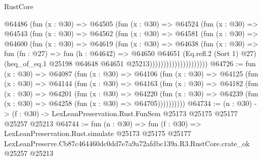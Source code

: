 \begin{lexlean}{RustCore}
\begin{coremodule}
                        @64486
                          (fun (x : @30) =>
                          @64505
                            (fun (x : @30) =>
                            @64524
                              (fun (x : @30) =>
                              @64543
                                (fun (x : @30) =>
                                @64562
                                  (fun (x : @30) =>
                                  @64581
                                    (fun (x : @30) =>
                                    @64600
                                      (fun (x : @30) =>
                                      @64619
                                        (fun (x : @30) =>
                                        @64638
                                          (fun (x : @30) =>
                                          fun (fn : @27) =>
                                          fun (h : @64642) =>
                                          @64650
                                            @64651
                                            (Eq.refl.{2} (Sort 1) @27)
                                            (heq_of_eq.{1}
                                              @25198
                                              @64648
                                              @64651
                                              @25213)))))))))))))))))))))
@64726 := fun (x : @30) =>
  @64087
    (fun (x : @30) =>
    @64106
      (fun (x : @30) =>
      @64125
        (fun (x : @30) =>
        @64144
          (fun (x : @30) =>
          @64163
            (fun (x : @30) =>
            @64182
              (fun (x : @30) =>
              @64201
                (fun (x : @30) =>
                @64220
                  (fun (x : @30) =>
                  @64239 (fun (x : @30) => @64258 (fun (x : @30) => @64705))))))))))
@64734 := (n : @30) ->
  (f : @30) -> LexLeanPreservation.Rust.FunSem @25173 @25175 @25177 @25257 @25213
@64744 := fun (n : @30) =>
  fun (f : @30) =>
  LexLeanPreservation.Rust.simulate
    @25173
    @25175
    @25177
    LexLeanPreserve.Cb87c464460dc0dd7e7a9a72afdbc139a.R3.RustCore.crate_ok
    @25257
    @25213
\end{coremodule}
\end{lexlean}
